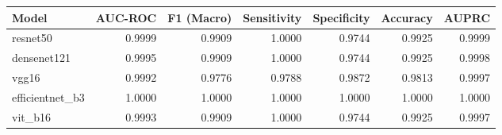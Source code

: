 \begin{tabular}{lrrrrrr}
\toprule
Model & AUC-ROC & F1 (Macro) & Sensitivity & Specificity & Accuracy & AUPRC \\
\midrule
resnet50 & 0.9999 & 0.9909 & 1.0000 & 0.9744 & 0.9925 & 0.9999 \\
densenet121 & 0.9995 & 0.9909 & 1.0000 & 0.9744 & 0.9925 & 0.9998 \\
vgg16 & 0.9992 & 0.9776 & 0.9788 & 0.9872 & 0.9813 & 0.9997 \\
efficientnet_b3 & 1.0000 & 1.0000 & 1.0000 & 1.0000 & 1.0000 & 1.0000 \\
vit_b16 & 0.9993 & 0.9909 & 1.0000 & 0.9744 & 0.9925 & 0.9997 \\
\bottomrule
\end{tabular}
